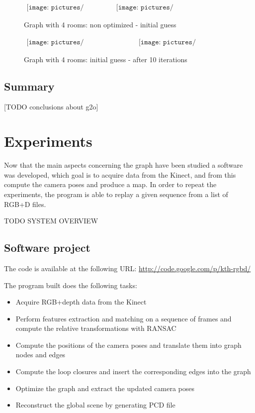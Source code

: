 \begin{figure}[h!]
\centering$
\begin{array}{cc}
\texttt{[image: pictures/graph4\_base]} &
\texttt{[image: pictures/graph4\_initial\_guess]}
\end{array}$
\caption{Graph with 4 rooms: non optimized - initial guess}
\end{figure}
\begin{figure}[h!]
\centering$
\begin{array}{cc}
\texttt{[image: pictures/graph4\_initial\_guess]} &
\texttt{[image: pictures/graph4\_optimized]}
\end{array}$
\caption{Graph with 4 rooms: initial guess - after 10 iterations}
\end{figure}

\section{Summary}

[TODO conclusions about g2o]

\clearpage

\chapter{Experiments}
\label{chap:experiments}

Now that the main aspects concerning the graph have been studied a software was developed, which goal is to acquire data from the Kinect, and from this compute the camera poses and produce a map. In order to repeat the experiments, the program is able to replay a given sequence from a list of RGB+D files.

TODO SYSTEM OVERVIEW


\section{Software project}

The code is available at the following URL: \url{http://code.google.com/p/kth-rgbd/}

The program built does the following tasks:
\begin{itemize}
\item Acquire RGB+depth data from the Kinect
\item Perform features extraction and matching on a sequence of frames and compute the relative transformations with RANSAC
\item Compute the positions of the camera poses and translate them into graph nodes and edges
\item Compute the loop closures and insert the corresponding edges into the graph
\item Optimize the graph and extract the updated camera poses
\item Reconstruct the global scene by generating PCD file
\end{itemize}

